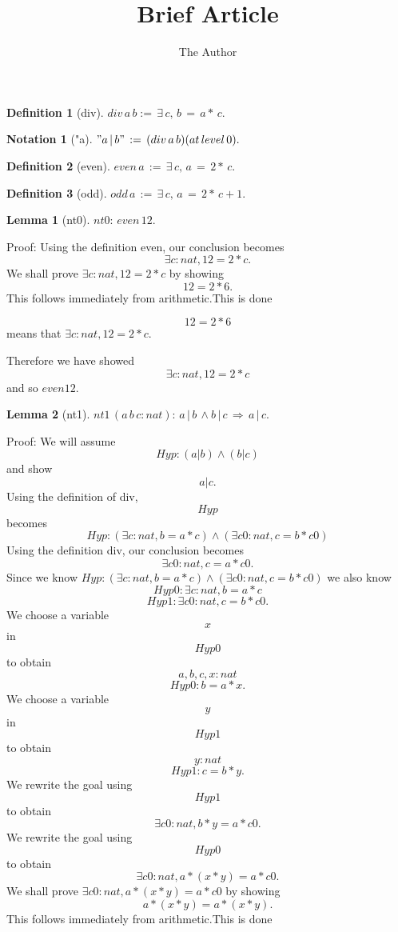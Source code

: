 \documentclass[11pt, oneside]{article}
\title{Brief Article}
\author{The Author}
\date{}							%
\newtheorem{Lemma}{Lemma}
\newtheorem{Definition}{Definition}
\newtheorem{Notation}{Notation}
\begin{document}
\maketitle

\begin{Definition}[div] \label{Definition:div}
$div\,a\,b:=\,\exists \,c,\,b\,=\,a*\,c.$
 \end{Definition}
\begin{Notation}["a] \label{Notation:"a}
$"a\,|\,b"\,:=\,(div\,a\,b)(at\,level\,0).$
 \end{Notation}
\begin{Definition}[even] \label{Definition:even}
$even\,a\,:=\,\exists \,c,\,a\,=\,2*\,c.$
 \end{Definition}
\begin{Definition}[odd] \label{Definition:odd}
$odd\,a\,:=\,\exists \,c,\,a\,=\,2*\,c+1.$
 \end{Definition}
\begin{Lemma}[nt0] \label{Lemma:nt0}
$nt0:\,even\,12.$
 \end{Lemma}


 Proof: Using the definition even, our conclusion becomes $$\exists c : nat, 12 = 2 * c .$$We shall prove $\exists c : nat, 12 = 2 * c $ by showing $$12 = 2 * 6 .$$This follows immediately from arithmetic.This is done

 $$12 = 2 * 6 $$ means that $\exists c : nat, 12 = 2 * c $.

 Therefore we have showed $$\exists c : nat, 12 = 2 * c $$ and so $even 12 $.\begin{Lemma}[nt1] \label{Lemma:nt1}
$nt1\,(a\,b\,c:nat):\,a\,|\,b\,\land b\,|\,c\,\Rightarrow \,a\,|\,c.$
 \end{Lemma}


 Proof: We will assume $$Hyp : (a | b) \land (b | c) $$ and show $$a | c .$$Using the definition of div, $$Hyp $$ becomes $$Hyp : (\exists c : nat, b = a * c) \land (\exists c0 : nat, c = b * c0) $$ Using the definition div, our conclusion becomes $$\exists c0 : nat, c = a * c0 .$$Since we know $Hyp : (\exists c : nat, b = a * c) \land (\exists c0 : nat, c = b * c0) $ we also know $$Hyp0 : \exists c : nat, b = a * c $$ $$Hyp1 : \exists c0 : nat, c = b * c0 .$$We choose a variable $$x$$ in $$Hyp0 $$ to obtain $$a, b, c, x : nat $$ $$Hyp0 : b = a * x .$$ We choose a variable $$y$$ in $$Hyp1 $$ to obtain $$y : nat $$ $$Hyp1 : c = b * y .$$ We rewrite the goal using $$Hyp1 $$ to obtain $$\exists c0 : nat, b * y = a * c0 .$$We rewrite the goal using $$Hyp0 $$ to obtain $$\exists c0 : nat, a * (x * y) = a * c0 .$$We shall prove $\exists c0 : nat, a * (x * y) = a * c0 $ by showing $$a * (x * y) = a * (x * y) .$$This follows immediately from arithmetic.This is done
\end{document}
